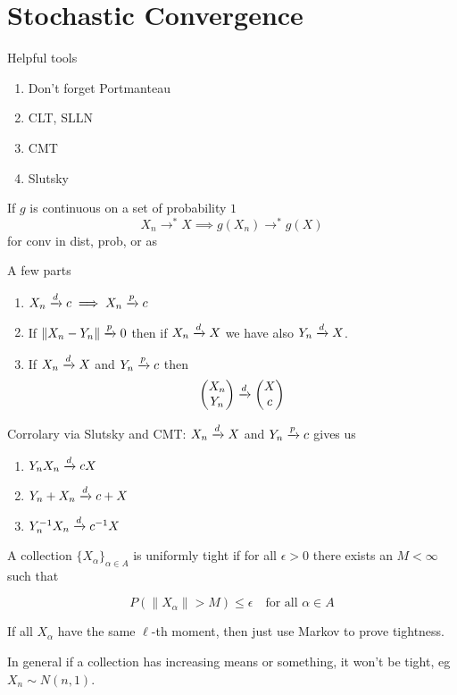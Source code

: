 \documentclass{article}
\begin{document}
\newpage
\section{Stochastic Convergence}
Helpful tools
\begin{enumerate}
	\item Don't forget Portmanteau
	\item CLT, SLLN 
	\item CMT
	\item Slutsky
\end{enumerate} 
\begin{theorem}[CMT]
If $g$ is continuous on a set of probability $1$
$$X_n\to^* X \implies g(X_n) \to^* g(X)$$
for conv in dist, prob, or as
\end{theorem}
\begin{theorem}[Slutsky]
A few parts
\begin{enumerate}
	\item $X_n \xrightarrow{d} c \implies X_n \xrightarrow{p} c$
	\item If $\|X_n - Y_n\| \xrightarrow{p} 0$ then if $X_n \xrightarrow{d} X$ we have also $Y_n \xrightarrow{d} X$. 
	\item If $X_n \xrightarrow{d} X$ and $Y_n \xrightarrow{p} c$ then
	$$\begin{pmatrix}
		X_n\\Y_n 
	\end{pmatrix}\xrightarrow{d} \begin{pmatrix}
		X\\c 
	\end{pmatrix}$$
	\end{enumerate}
	Corrolary via Slutsky and CMT:
	$X_n\xrightarrow{d} X$ and $Y_n \xrightarrow{p} c$ gives us 
	\begin{enumerate}
	\item $Y_n X_n \xrightarrow{d} cX$
	\item $Y_n + X_n \xrightarrow{d} c+ X$
	\item $Y_n^{-1} X_n \xrightarrow{d} c^{-1} X$
	\end{enumerate}

\end{theorem}
\begin{definition}
A collection $\{X_\alpha\}_{\alpha \in A}$ is uniformly tight if for all $\epsilon>0$ there exists an $M<\infty$ such that 

$$P(\|X_\alpha\|>M) \leq \epsilon \quad \text{for all } \alpha \in A$$
\end{definition}
\begin{example}
If all $X_\alpha$ have the same $\ell$-th moment, then just use Markov to prove tightness. 
\end{example}
In general if a collection has increasing means or something, it won't be tight, eg $X_n \sim N(n,1)$. 
\end{document}
